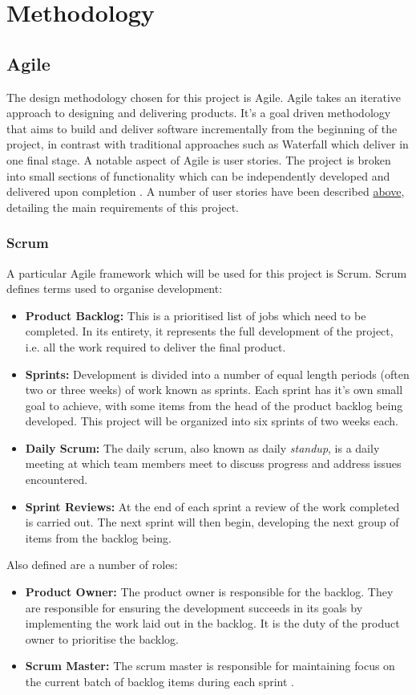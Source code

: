 \section{Methodology}
	\subsection{Agile}
	The design methodology chosen for this project is Agile. Agile takes an iterative approach to designing and delivering products. It's a goal driven methodology that aims to build and deliver software incrementally from the beginning of the project, in contrast with traditional approaches such as Waterfall which deliver in one final stage. A notable aspect of Agile is user stories. The project is broken into small sections of functionality which can be independently developed and delivered upon completion \citep{rasmusson}. A number of user stories have been described \hyperref[user-stories]{above}, detailing the main requirements of this project. 
	
	\subsubsection{Scrum}
	
	A particular Agile framework which will be used for this project is Scrum. Scrum defines terms used to organise development:
	\begin{itemize}
		\item \textbf{Product Backlog:} This is a prioritised list of jobs which need to be completed. In its entirety, it represents the full development of the project, i.e. all the work required to deliver the final product.
		\item \textbf{Sprints:} Development is divided into a number of equal length periods (often two or three weeks) of work known as sprints. Each sprint has it's own small goal to achieve, with some items from the head of the product backlog being developed. This project will be organized into six sprints of two weeks each.
		\item \textbf{Daily Scrum:} The daily scrum, also known as daily \textit{standup}, is a daily meeting at which team members meet to discuss progress and address issues encountered.
		\item \textbf{Sprint Reviews:} At the end of each sprint a review of the work completed is carried out. The next sprint will then begin, developing the next group of items from the backlog being\citep{scrum}.
	\end{itemize}
	Also defined are a number of roles:
	\begin{itemize}
		\item \textbf{Product Owner:} The product owner is responsible for the backlog. They are responsible for ensuring the development succeeds in its goals by implementing the work laid out in the backlog. It is the duty of the product owner to prioritise the backlog. 
		\item \textbf{Scrum Master:} The scrum master is responsible for maintaining focus on the current batch of backlog items during each sprint \cite{agile}.
	\end{itemize}
	
